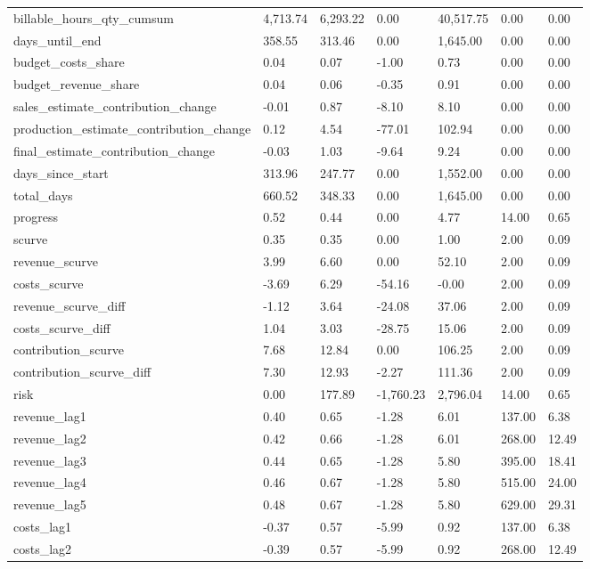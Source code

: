 \begin{landscape}
\begin{longtable}[h!]{lllllll}
billable_hours_qty_cumsum & 4,713.74 & 6,293.22 & 0.00 & 40,517.75 & 0.00 & 0.00 \\
days_until_end & 358.55 & 313.46 & 0.00 & 1,645.00 & 0.00 & 0.00 \\
budget_costs_share & 0.04 & 0.07 & -1.00 & 0.73 & 0.00 & 0.00 \\
budget_revenue_share & 0.04 & 0.06 & -0.35 & 0.91 & 0.00 & 0.00 \\
sales_estimate_contribution_change & -0.01 & 0.87 & -8.10 & 8.10 & 0.00 & 0.00 \\
production_estimate_contribution_change & 0.12 & 4.54 & -77.01 & 102.94 & 0.00 & 0.00 \\
final_estimate_contribution_change & -0.03 & 1.03 & -9.64 & 9.24 & 0.00 & 0.00 \\
days_since_start & 313.96 & 247.77 & 0.00 & 1,552.00 & 0.00 & 0.00 \\
total_days & 660.52 & 348.33 & 0.00 & 1,645.00 & 0.00 & 0.00 \\
progress & 0.52 & 0.44 & 0.00 & 4.77 & 14.00 & 0.65 \\
scurve & 0.35 & 0.35 & 0.00 & 1.00 & 2.00 & 0.09 \\
revenue_scurve & 3.99 & 6.60 & 0.00 & 52.10 & 2.00 & 0.09 \\
costs_scurve & -3.69 & 6.29 & -54.16 & -0.00 & 2.00 & 0.09 \\
revenue_scurve_diff & -1.12 & 3.64 & -24.08 & 37.06 & 2.00 & 0.09 \\
costs_scurve_diff & 1.04 & 3.03 & -28.75 & 15.06 & 2.00 & 0.09 \\
contribution_scurve & 7.68 & 12.84 & 0.00 & 106.25 & 2.00 & 0.09 \\
contribution_scurve_diff & 7.30 & 12.93 & -2.27 & 111.36 & 2.00 & 0.09 \\
risk & 0.00 & 177.89 & -1,760.23 & 2,796.04 & 14.00 & 0.65 \\
revenue_lag1 & 0.40 & 0.65 & -1.28 & 6.01 & 137.00 & 6.38 \\
revenue_lag2 & 0.42 & 0.66 & -1.28 & 6.01 & 268.00 & 12.49 \\
revenue_lag3 & 0.44 & 0.65 & -1.28 & 5.80 & 395.00 & 18.41 \\
revenue_lag4 & 0.46 & 0.67 & -1.28 & 5.80 & 515.00 & 24.00 \\
revenue_lag5 & 0.48 & 0.67 & -1.28 & 5.80 & 629.00 & 29.31 \\
costs_lag1 & -0.37 & 0.57 & -5.99 & 0.92 & 137.00 & 6.38 \\
costs_lag2 & -0.39 & 0.57 & -5.99 & 0.92 & 268.00 & 12.49 \\

\end{longtable}
\end{landscape}
